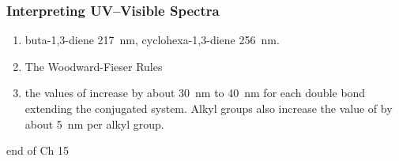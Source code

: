\subsubsection{Interpreting UV–Visible Spectra}

\begin{enumerate}
    \item buta-1,3-diene \qty{217}{\nano\meter}, cyclohexa-1,3-diene \qty{256}{\nano\meter}.
    \item The Woodward-Fieser Rules %
    \item the values of increase by about \qty{30}{\nano\meter} to \qty{40}{\nano\meter} for each double bond extending the conjugated system. Alkyl groups also increase the value of by about \qty{5}{\nano\meter} per alkyl group.
\end{enumerate}

\begin{example} %
    
\end{example}

end of Ch 15

